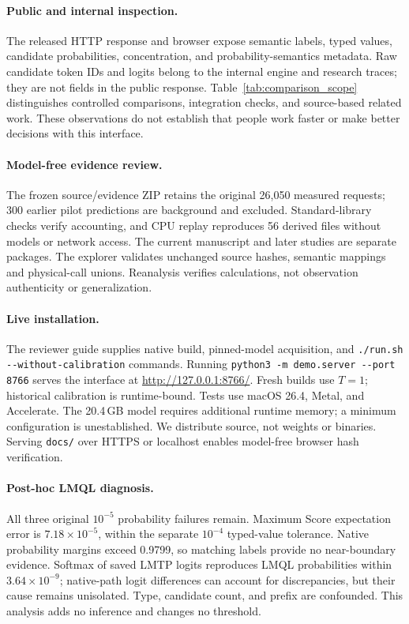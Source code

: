 \documentclass[11pt]{article}
\begin{document}
\paragraph{Public and internal inspection.}
The released HTTP response and browser expose semantic labels, typed values, candidate probabilities, concentration, and probability-semantics metadata. Raw candidate token IDs and logits belong to the internal engine and research traces; they are not fields in the public response. Table~\ref{tab:comparison_scope} distinguishes controlled comparisons, integration checks, and source-based related work. These observations do not establish that people work faster or make better decisions with this interface.

\paragraph{Model-free evidence review.}
The frozen source/evidence ZIP retains the original 26,050 measured requests; 300 earlier pilot predictions are background and excluded. Standard-library checks verify accounting, and CPU replay reproduces 56 derived files without models or network access. The current manuscript and later studies are separate packages. The explorer validates unchanged source hashes, semantic mappings and physical-call unions. Reanalysis verifies calculations, not observation authenticity or generalization.

\paragraph{Live installation.}
The reviewer guide supplies native build, pinned-model acquisition, and \texttt{./run.sh -{}-without-calibration} commands. Running \texttt{python3 -m demo.server -{}-port 8766} serves the interface at \url{http://127.0.0.1:8766/}. Fresh builds use $T=1$; historical calibration is runtime-bound. Tests use macOS 26.4, Metal, and Accelerate. The 20.4\,GB model requires additional runtime memory; a minimum configuration is unestablished. We distribute source, not weights or binaries. Serving \texttt{docs/} over HTTPS or localhost enables model-free browser hash verification.

\paragraph{Post-hoc LMQL diagnosis.}
All three original $10^{-5}$ probability failures remain. Maximum Score expectation error is $7.18\times10^{-5}$, within the separate $10^{-4}$ typed-value tolerance. Native probability margins exceed 0.9799, so matching labels provide no near-boundary evidence. Softmax of saved LMTP logits reproduces LMQL probabilities within $3.64\times10^{-9}$; native-path logit differences can account for discrepancies, but their cause remains unisolated. Type, candidate count, and prefix are confounded. This analysis adds no inference and changes no threshold.
\end{document}
